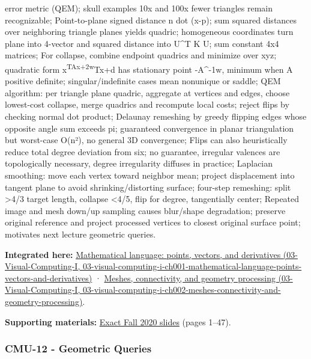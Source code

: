 error metric (QEM); skull examples 10x and 100x fewer triangles remain recognizable; Point-to-plane signed distance n dot (x-p); sum squared distances over neighboring triangle planes yields quadric; homogeneous coordinates turn plane into 4-vector and squared distance into U\^{}T K U; sum constant 4x4 matrices; For collapse, combine endpoint quadrics and minimize over xyz; quadratic form x\textsuperscript{TAx+2w}Tx+d has stationary point -A\^{}-1w, minimum when A positive definite; singular/indefinite cases mean nonunique or saddle; QEM algorithm: per triangle plane quadric, aggregate at vertices and edges, choose lowest-cost collapse, merge quadrics and recompute local costs; reject flips by checking normal dot product; Delaunay remeshing by greedy flipping edges whose opposite angle sum exceeds pi; guaranteed convergence in planar triangulation but worst-case O(n²), no general 3D convergence; Flips can also heuristically reduce total degree deviation from six; no guarantee, irregular valences are topologically necessary, degree irregularity diffuses in practice; Laplacian smoothing: move each vertex toward neighbor mean; project displacement into tangent plane to avoid shrinking/distorting surface; four-step remeshing: split \textgreater4/3 target length, collapse \textless4/5, flip for degree, tangentially center; Repeated image and mesh down/up sampling causes blur/shape degradation; preserve original reference and project processed vertices to closest original surface point; motivates next lecture geometric queries.

\textbf{Integrated here:} \href{../03-Visual-Computing-I/main.pdf\#nameddest=03-visual-computing-i-ch001-mathematical-language-points-vectors-and-derivatives}{Mathematical language: points, vectors, and derivatives (03-Visual-Computing-I, 03-visual-computing-i-ch001-mathematical-language-points-vectors-and-derivatives)} · \href{../03-Visual-Computing-I/main.pdf\#nameddest=03-visual-computing-i-ch002-meshes-connectivity-and-geometry-processing}{Meshes, connectivity, and geometry processing (03-Visual-Computing-I, 03-visual-computing-i-ch002-meshes-connectivity-and-geometry-processing)}.

\textbf{Supporting materials:} \href{https://15462.courses.cs.cmu.edu/fall2020content/lectures/11_geometryprocessing/11_geometryprocessing_slides.pdf}{Exact Fall 2020 slides} (pages 1--47).

\subsubsection{CMU-12 - Geometric Queries}\label{04-visual-computing-ii-ch036-cmu-12---geometric-queries}

